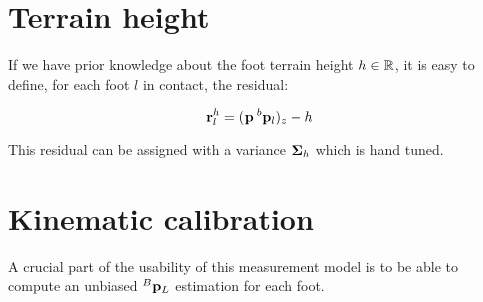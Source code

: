 \section{Terrain height}

If we have prior knowledge about the foot terrain height $h \in \mathbb{R}$, it is easy to define, for each foot $l$ in contact, the residual:

\begin{equation}
    {\bf r}^h_l = (\prescript{}{}{{\bf p}}_{} \prescript{b}{}{{\bf p}}_{l})_z - h
\end{equation}

This residual can be assigned with a variance ${\bm \Sigma}_h$ which is hand tuned.

\section{Kinematic calibration}
A crucial part of the usability of this measurement model is to be able to compute an unbiased $\prescript{B}{}{{\bf p}}_{L}$ estimation for each foot.
